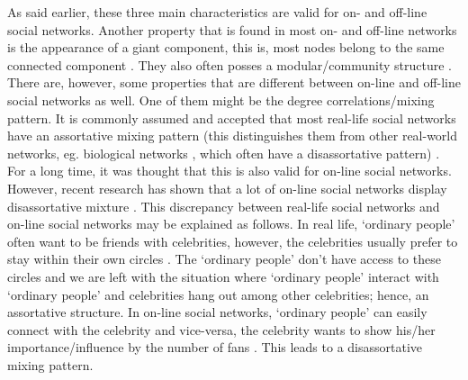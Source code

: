 \documentclass[11 pt , letterpaper , twoside , openright]{book}
\begin{document}
\newline
As said earlier, these three main characteristics are valid for on- and off-line social networks. Another property that is found in most on- and off-line networks is the appearance of a giant component, this is, most nodes belong to the same connected component \cite{Latapy}. They also often posses a modular/community structure \cite{Ferrara2012}\cite{McGlohon2011}. \\
There are, however, some properties that are different between on-line and off-line social networks as well. One of them might be the degree correlations/mixing pattern. It is commonly assumed and accepted that most real-life social networks have an assortative mixing pattern (this distinguishes them from other real-world networks, eg. biological networks \cite{F.Costa2007}, which often have a disassortative pattern) \cite{Hu2009}\cite{Zhang2014}. For a long time, it was thought that this is also valid for on-line social networks. However, recent research has shown that a lot of on-line social networks display disassortative mixture \cite{Hu2009}\cite{Zhang2014}. This discrepancy between real-life social networks and on-line social networks may be explained as follows. In real life, `ordinary people' often want to be friends with celebrities, however, the celebrities usually prefer to stay within their own circles \cite{Hu2009}\cite{Zhang2014}. The `ordinary people' don't have access to these circles and we are left with the situation where `ordinary people' interact with `ordinary people' and celebrities hang out among other celebrities; hence, an assortative structure. In on-line social networks, `ordinary people' can easily connect with the celebrity and vice-versa, the celebrity wants to show his/her importance/influence by the number of fans \cite{Hu2009}\cite{Zhang2014}. This leads to a disassortative mixing pattern.
\end{document}
